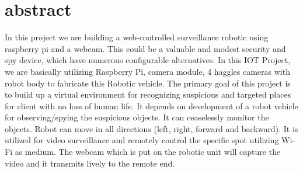 \section*{abstract}
In this project we are building a web-controlled surveillance robotic using raspberry pi and a webcam. This could be a valuable and modest security and spy device, which have numerous configurable alternatives. In this IOT Project, we are basically utilizing Raspberry Pi, camera module, 4 haggles cameras with robot body to fabricate this Robotic vehicle. The primary goal of this project is to build up a virtual environment for recognizing suspicious and targeted places for client with no loss of human life. It depends on development of a robot vehicle for observing/spying the suspicious objects. It can ceaselessly monitor the objects. Robot can move in all directions (left, right, forward and backward). It is utilized for video surveillance and remotely control the specific spot utilizing Wi-Fi as medium. The webcam which is put on the robotic unit will capture the video and it transmits lively to the remote end.

\cite{adams1995hitchhiker}
